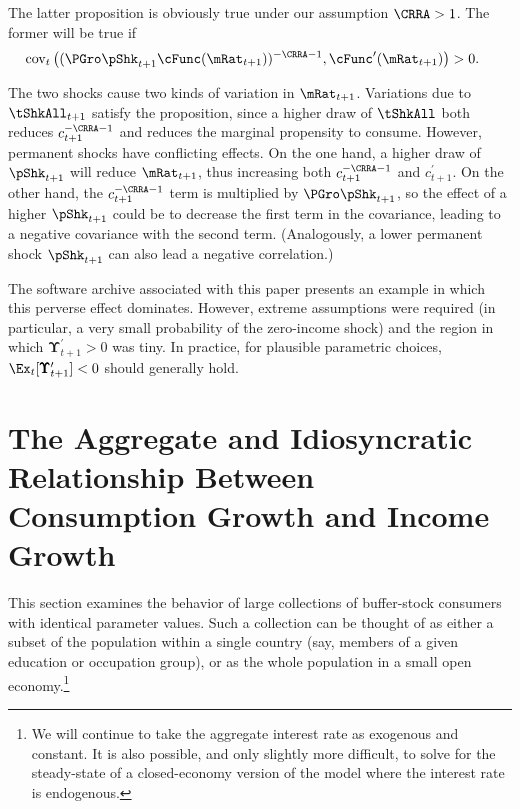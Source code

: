 \documentclass[./BufferStockTheory.tex]{subfiles}
\begin{document}
The latter proposition is obviously true under our assumption $\CRRA > 1$.  The former will be true if
\begin{align*}
  \mbox{cov}_{t}\left((\PGro \pShk_{t+1} \cFunc(\mRat_{t+1}))^{-\CRRA-1},\cFunc^{\prime}(\mRat_{t+1}) \right)  & > 0 \nonumber.
\end{align*}

The two shocks cause two kinds of variation in $\mRat_{t+1}$.
Variations due to $\tShkAll_{t+1}$ satisfy the proposition, since a
higher draw of $\tShkAll$ both reduces $c_{t+1}^{-\CRRA-1}$ and
reduces the marginal propensity to consume.  However, permanent shocks
have conflicting effects.  On the one hand, a higher draw of
$\pShk_{t+1}$ will reduce $\mRat_{t+1}$, thus increasing both
$c_{t+1}^{-\CRRA-1}$ and $c_{t+1}^{\prime}$.  On the other hand, the
$c_{t+1}^{-\CRRA-1}$ term is multiplied by $\PGro \pShk_{t+1}$, so the
effect of a higher $\pShk_{t+1}$ could be to decrease the first term
in the covariance, leading to a negative covariance with the second
term.  (Analogously, a lower permanent shock $\pShk_{t+1}$ can also
lead a negative correlation.)


The software archive associated with this paper presents an example in
which this perverse effect dominates.  However, extreme assumptions
were required (in particular, a very small probability of the
zero-income shock) and the region in which
$\pmb{\Upsilon}_{t+1}^{\prime} > 0$ was tiny.  In practice, for
plausible parametric choices,
$\Ex_{t}[\pmb{\Upsilon}_{t+1}^{\prime}]<0$ should generally hold.




\hypertarget{The-Aggregate-and-Idiosyncratic-Relationship-Between-Consumption-Growth-and-Income-Growth}{}
\section{The Aggregate and Idiosyncratic Relationship Between
Consumption Growth and Income Growth}

This section examines the behavior of large collections of buffer-stock consumers with identical parameter values. Such a collection can be thought of as either a subset of the population within a single country (say, members of a given education or occupation group), or as the whole population in a small open economy.\footnote{We will continue to take the aggregate interest rate as exogenous and constant. It is also possible, and only slightly more difficult, to solve for the steady-state of a closed-economy version of the model where the interest rate is endogenous.}
\end{document}
